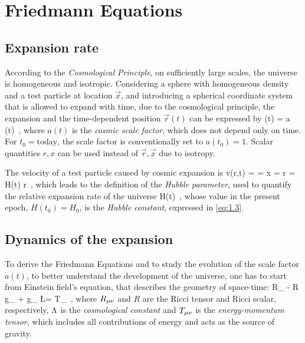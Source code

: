 \section{Friedmann Equations}
\label{sec:friedmann_eq}


\subsection{Expansion rate}
\label{subsec:exp_rate}
According to the \emph{Cosmological Principle}, on sufficiently large scales, the universe is homogeneous and isotropic. Considering a sphere with homogeneous density and a test particle at location $\vec{x}$, and introducing a spherical coordinate system that is allowed to expand with time, due to the cosmological principle, the expansion and the time-dependent position $\vec{r}(t)$ can be expressed by
\be
\label{eq:1.5}
 (t) = a (t)  \,,
\ee
where $a (t)$ is the \emph{cosmic scale factor}, which does not depend only on time. For $t_0 = \mathrm{today}$, the scale factor is conventionally set to $a(t_0) = 1$. Scalar quantities $r, x$ can be used instead of $\vec{r}, \vec{x}$ due to isotropy.

The velocity of a test particle caused by cosmic expansion is
\be
\label{eq:1.6}
v(r,t) =  =  x =  r = H(t) r \,,
\ee
which leads to the definition of the \emph{Hubble parameter}, used to quantify the relative expansion rate of the universe
\be
\label{eq:1.7}
H(t) \equiv {} \,,
\ee
whose value in the present epoch, $H(t_0) = H_0$, is the \emph{Hubble constant}, expressed in \cref{eq:1.3}.


\subsection{Dynamics of the expansion}
\label{subsec:exp_dyn}
To derive the Friedmann Equations and to study the evolution of the scale factor $a (t)$, to better understand the development of the universe, one has to start from Einstein field's equation, that describes the geometry of space-time:
\be
\label{eq:1.8}
R_{\m \nu} -  R g_{\m \nu} + g_{\m \nu} \L =  T_{\m \nu} \,,
\ee
where $R_{\mu \nu}$ and $R$ are the Ricci tensor and Ricci scalar, respectively, $\Lambda$ is the \emph{cosmological constant} and $T_{\mu \nu}$ is the \emph{energy-momentum tensor}, which includes all contributions of energy and acts as the source of gravity.

